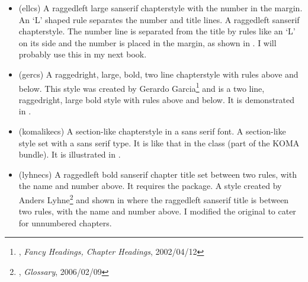 \begin{itemize}


\item[\cstyle{ell}]
\glossary(ellcs)%
  {}%
  {A raggedleft large sanserif chapterstyle with the number in the margin. An
   `L' shaped rule separates the number and title lines.}
  A raggedleft sanserif chapterstyle.
  The number line is separated
  from the title by rules like an `L' on its side and the number is placed
  in the margin, as shown in .
I will probably use this in my next book.


\item[\cstyle{ger}]
\glossary(gercs)%
  {}%
  {A raggedright, large, bold, two line chapterstyle with rules
   above and below.}
This style was created by
Gerardo Garcia\footnote{\ctt,
  \textit{Fancy Headings, Chapter Headings}, 2002/04/12} and is a two line,
  raggedright, large bold style with rules above and below. It is
  demonstrated in .


\item[\cstyle{komalike}]
\glossary(komalikecs)%
  {}%
  { A section-like chapterstyle in a sans serif font.}
A section-like style set with a sans serif type. It is like that in the
 class (part of the KOMA bundle).
It is illustrated in
.



\item[\cstyle{lyhne}]
\glossary(lyhnecs)%
  {}%
  {A raggedleft bold sanserif chapter title set between two rules, with the
   name and number above. It requires the  package.}
  A style created by Anders
  Lyhne\footnote{\ctt, \textit{Glossary}, 2006/02/09} and shown in 
  where the raggedleft
  sanserif title is between two rules, with the name and number above.
  I modified the original to cater for unnumbered chapters.


\end{itemize}
